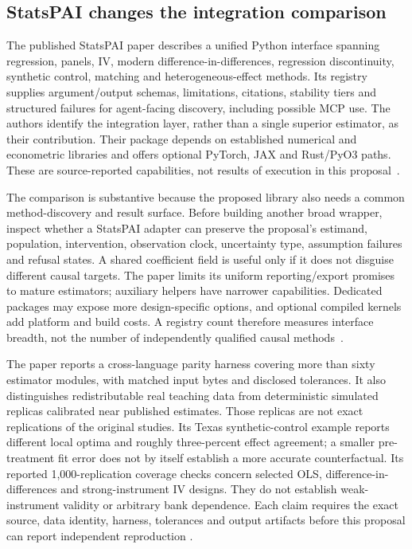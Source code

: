 \subsection{StatsPAI changes the integration comparison}
\label{exec23:proof-statspai}
The published StatsPAI paper describes a unified Python interface spanning
regression, panels, IV, modern difference-in-differences, regression
discontinuity, synthetic control, matching and heterogeneous-effect methods.
Its registry supplies argument/output schemas, limitations, citations,
stability tiers and structured failures for agent-facing discovery, including
possible MCP use. The authors identify the integration layer, rather than a
single superior estimator, as their contribution. Their package depends on
established numerical and econometric libraries and offers optional PyTorch,
JAX and Rust/PyO3 paths. These are source-reported capabilities, not results
of execution in this proposal~\citep{exec23_statspai_paper}.

The comparison is substantive because the proposed library also needs a
common method-discovery and result surface. Before building another broad
wrapper, inspect whether a StatsPAI adapter can preserve the proposal's
estimand, population, intervention, observation clock, uncertainty type,
assumption failures and refusal states. A shared coefficient field is useful
only if it does not disguise different causal targets. The paper limits its
uniform reporting/export promises to mature estimators; auxiliary helpers
have narrower capabilities. Dedicated packages may expose more design-specific
options, and optional compiled kernels add platform and build costs. A
registry count therefore measures interface breadth, not the number of
independently qualified causal methods~\citep{exec23_statspai_paper}.

The paper reports a cross-language parity harness covering more than sixty
estimator modules, with matched input bytes and disclosed tolerances. It also
distinguishes redistributable real teaching data from deterministic simulated
replicas calibrated near published estimates. Those replicas are not exact
replications of the original studies. Its Texas synthetic-control example
reports different local optima and roughly three-percent effect agreement;
a smaller pre-treatment fit error does not by itself establish a more accurate
counterfactual. Its reported 1,000-replication coverage checks concern selected
OLS, difference-in-differences and strong-instrument IV designs. They do not
establish weak-instrument validity or arbitrary bank dependence. Each claim
requires the exact source, data identity, harness, tolerances and output
artifacts before this proposal can report independent reproduction
\citep{exec23_statspai_paper}.

